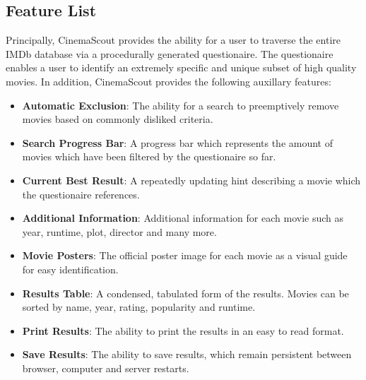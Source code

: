 \documentclass{article}
\begin{document}
\subsection{Feature List}
Principally, CinemaScout provides the ability for a user to traverse the entire
IMDb database via a procedurally generated questionaire. The questionaire 
enables a user to identify an extremely specific and unique subset of high
quality movies. In addition, CinemaScout provides the following auxillary 
features:
\begin{itemize}
\item \textbf{Automatic Exclusion}: The ability for a search to preemptively 
remove movies based on commonly disliked criteria.
\item \textbf{Search Progress Bar}: A progress bar which represents the amount
of movies which have been filtered by the questionaire so far.
\item \textbf{Current Best Result}: A repeatedly updating hint describing a
movie which the questionaire references.
\item \textbf{Additional Information}: Additional information for each
movie such as year, runtime, plot, director and many more.
\item \textbf{Movie Posters}: The official poster image for each movie as a 
visual guide for easy identification.
\item \textbf{Results Table}: A condensed, tabulated form of the results.
Movies can be sorted by name, year, rating, popularity and runtime.
\item \textbf{Print Results}: The ability to print the results in an easy to
read format.
\item \textbf{Save Results}: The ability to save results, which remain 
persistent between browser, computer and server restarts.
\end{itemize}
\end{document}
